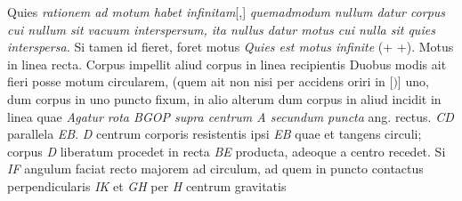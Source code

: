 Quies
\textit{rationem ad motum habet infinitam}[,]
\textit{quemadmodum nullum datur corpus cui nullum sit vacuum interspersum,
ita nullus datur motus cui nulla sit quies interspersa.}
Si tamen id fieret, foret motus
\textit{Quies est motus infinite
} (+  +). 
Motus in linea recta. Corpus impellit aliud corpus in linea
recipientis 
Duobus modis ait fieri posse motum circularem,
(quem ait non nisi per accidens oriri in
$\lbrack)\rbrack$
uno, dum corpus in uno puncto fixum, in alio 
alterum dum corpus in aliud incidit in linea quae
\pend
\pstart 
\textit{Agatur rota BGOP supra centrum A secundum puncta
}
ang. rectus. \textit{CD} parallela \textit{EB}. \textit{D} centrum corporis resistentis ipsi \textit{EB} quae et tangens circuli; corpus \textit{D} liberatum procedet in recta \textit{BE} producta, adeoque a centro recedet. Si \textit{IF} angulum faciat recto majorem ad circulum, ad quem  in puncto contactus perpendicularis \textit{IK} et \textit{GH} per \textit{H} centrum gravitatis\protect{} 
